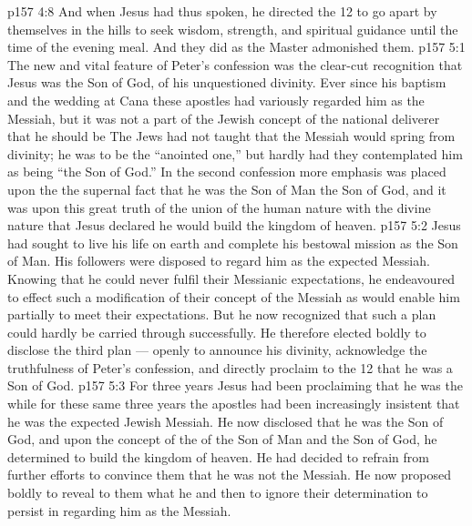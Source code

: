 \vs p157 4:8 \pc And when Jesus had thus spoken, he directed the 12 to go apart by themselves in the hills to seek wisdom, strength, and spiritual guidance until the time of the evening meal. And they did as the Master admonished them.
\vs p157 5:1 The new and vital feature of Peter’s confession was the clear\hyp{}cut recognition that Jesus was the Son of God, of his unquestioned divinity. Ever since his baptism and the wedding at Cana these apostles had variously regarded him as the Messiah, but it was not a part of the Jewish concept of the national deliverer that he should be  The Jews had not taught that the Messiah would spring from divinity; he was to be the “anointed one,” but hardly had they contemplated him as being “the Son of God.” In the second confession more emphasis was placed upon the  the supernal fact that he was the Son of Man  the Son of God, and it was upon this great truth of the union of the human nature with the divine nature that Jesus declared he would build the kingdom of heaven.
\vs p157 5:2 Jesus had sought to live his life on earth and complete his bestowal mission as the Son of Man. His followers were disposed to regard him as the expected Messiah. Knowing that he could never fulfil their Messianic expectations, he endeavoured to effect such a modification of their concept of the Messiah as would enable him partially to meet their expectations. But he now recognized that such a plan could hardly be carried through successfully. He therefore elected boldly to disclose the third plan --- openly to announce his divinity, acknowledge the truthfulness of Peter’s confession, and directly proclaim to the 12 that he was a Son of God.
\vs p157 5:3 For three years Jesus had been proclaiming that he was the  while for these same three years the apostles had been increasingly insistent that he was the expected Jewish Messiah. He now disclosed that he was the Son of God, and upon the concept of the  of the Son of Man and the Son of God, he determined to build the kingdom of heaven. He had decided to refrain from further efforts to convince them that he was not the Messiah. He now proposed boldly to reveal to them what he  and then to ignore their determination to persist in regarding him as the Messiah.
